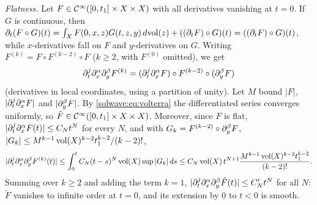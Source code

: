\emph{Flatness.} Let $F\in\mathcal{C}^\infty([0,t_1]\times X\times X)$ with all derivatives vanishing at $t=0$.
If $G$ is continuous, then
$\partial_t(F\circ G)(t)=\int_XF(0,x,z)G(t,z,y)\,d\mathrm{vol}(z)+((\partial_tF)\circ G)(t)=((\partial_tF)\circ G)(t)$, while
$x$-derivatives fall on $F$ and $y$-derivatives on $G$. Writing $F^{(k)}=F\circ F^{(k-2)}\circ F$
($k\ge2$, with $F^{(0)}$ omitted), we get
\begin{equation*}
  \partial_t^j\partial_x^\alpha\partial_y^\beta F^{(k)}=(\partial_t^j\partial_x^\alpha F)\circ F^{(k-2)}\circ(\partial_y^\beta F)
\end{equation*}
(derivatives in local coordinates, using a partition of unity). Let $M$ bound $|F|$,
$|\partial_t^j\partial_x^\alpha F|$ and $|\partial_y^\beta F|$. By \eqref{solwave:eq:volterra} the differentiated
series converges uniformly, so $\tilde F\in\mathcal{C}^\infty([0,t_1]\times X\times X)$. Moreover, since $F$ is flat,
$|\partial_t^j\partial_x^\alpha F(t)|\le C_Nt^N$ for every $N$, and with $G_k=F^{(k-2)}\circ\partial_y^\beta F$,
$|G_k|\le M^{k-1}\operatorname{vol}(X)^{k-2}t_1^{k-2}/(k-2)!$,
\begin{equation*}
  |\partial_t^j\partial_x^\alpha\partial_y^\beta F^{(k)}(t)|\le\int_0^tC_N(t-s)^N\operatorname{vol}(X)\sup|G_k|\,ds
  \le C_N\operatorname{vol}(X)\,t^{N+1}\frac{M^{k-1}\operatorname{vol}(X)^{k-2}t_1^{k-2}}{(k-2)!}.
\end{equation*}
Summing over $k\ge2$ and adding the term $k=1$, $|\partial_t^j\partial_x^\alpha\partial_y^\beta\tilde F(t)|\le C'_Nt^N$
for all $N$: $\tilde F$ vanishes to infinite order at $t=0$, and its extension by $0$ to $t<0$ is smooth.

